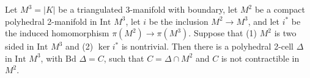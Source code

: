Let $M^3 = |K|$ be a triangulated 3-manifold with boundary, let $M^2$ be a compact polyhedral 2-manifold in $\text{Int } M^3$, let $i$ be the inclusion $M^2 \rightarrow M^3$, and let $i^*$ be the induced homomorphism $\pi(M^2) \rightarrow \pi(M^3)$. Suppose that (1) $M^2$ is two sided in $\text{Int } M^3$ and (2) $\ker i^*$ is nontrivial. Then there is a polyhedral 2-cell $\Delta$ in $\text{Int } M^3$, with $\text{Bd } \Delta = C$, such that $C = \Delta \cap M^2$ and $C$ is not contractible in $M^2$.
